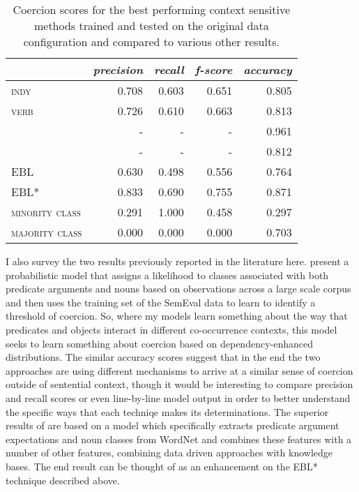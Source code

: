 \begin{table}
\centering
\begin{tabular}{lrrrr}
\hline
& \emph{precision} & \emph{recall} & \emph{f-score} & \emph{accuracy} \\
\hline
\textsc{indy} & 0.708 & 0.603 & 0.651 & 0.805 \\
\textsc{verb} & 0.726 & 0.610 & 0.663 & 0.813 \\
\cite{RobertsEA2010} & - & - & - & 0.961 \\
\cite{RobertsEA2011} & - & - & - & 0.812 \\
\textsc{EBL} & 0.630 & 0.498 & 0.556 & 0.764 \\
\textsc{EBL*} & 0.833 & 0.690 & 0.755 & 0.871 \\
\textsc{minority class} & 0.291 & 1.000 & 0.458 & 0.297 \\
\textsc{majority class} & 0.000 & 0.000 & 0.000 & 0.703 \\
\hline
\end{tabular}
\caption[Coercion Scores Compared Against Other Methods]{Coercion scores for the best performing context sensitive methods trained and tested on the original data configuration and compared to various other results.}
\label{tab:coerpare}
\end{table}

I also survey the two results previously reported in the literature here.  \cite{RobertsEA2011} present a probabilistic model that assigns a likelihood to classes associated with both predicate arguments and nouns based on observations across a large scale corpus and then uses the training set of the SemEval data to learn to identify a threshold of coercion.  So, where my models learn something about the way that predicates and objects interact in different co-occurrence contexts, this model seeks to learn something about coercion based on dependency-enhanced distributions.  The similar accuracy scores suggest that in the end the two approaches are using different mechanisms to arrive at a similar sense of coercion outside of sentential context, though it would be interesting to compare precision and recall scores or even line-by-line model output in order to better understand the specific ways that each techniqe makes its determinations.  The superior results of \cite{RobertsEA2010} are based on a model which specifically extracts predicate argument expectations and noun classes from WordNet and combines these features with a number of other features, combining data driven approaches with knowledge bases.  The end result can be thought of as an enhancement on the \textsc{EBL*} technique described above.

